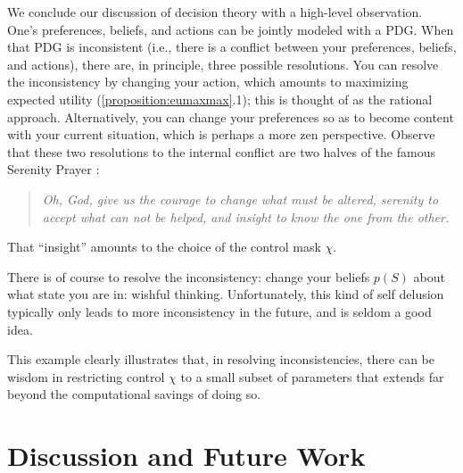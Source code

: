 \documentclass{article} %
\theoremstyle{plain}
\theoremstyle{definition}
\theoremstyle{remark}
\begin{document}
We conclude our discussion of decision theory with a high-level observation. 
One's preferences, beliefs, and actions can be jointly modeled with a PDG. 
When that PDG is inconsistent (i.e., there is a conflict between your preferences, beliefs, and actions),
there are, in principle, three possible resolutions.
You can 
resolve the inconsistency by changing your action, 
   which amounts to maximizing expected utility (\cref{proposition:eumaxmax}.1);
   this is thought of as the {rational} approach.
Alternatively, 
   you can change your preferences so as to become content with your current situation, 
   which is perhaps a more zen perspective. 
Observe that these two resolutions to the internal conflict are two halves of the famous Serenity Prayer \citep{serenity-prayer}:
\begin{quotation}\it
   \noindent
   Oh, God,
   give us the courage to change what must be altered, serenity to accept what can not be helped, and insight to know the one from the other.
\end{quotation}
That ``insight'' amounts to the choice of the control mask $\chi$. 

There is of course to resolve the inconsistency: change your beliefs $p(S)$ about what state you are in: wishful thinking. 
Unfortunately, this kind of self delusion typically only leads to more inconsistency in the future, and is seldom a good idea.  

This example clearly illustrates that,
   in resolving inconsistencies, 
   there can be wisdom in 
   restricting control $\chi$ to a small subset of parameters
   that extends far
   beyond the computational savings of doing so.




\section{Discussion and Future Work}
\end{document}
